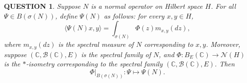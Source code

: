 \documentclass[12pt]{article}
\renewcommand{\b}{\mathscr{B}}
\renewcommand{\(}{\left(}%
\renewcommand{\)}{\right)}%
\renewcommand{\[}{\left[}%
\renewcommand{\]}{\right]}%
\renewcommand{\c}{\mathbb{C}}
\newtheorem{question}{QUESTION}[section]}
\begin{document}
  \begin{question}
   Suppose $N$ is a normal operator on Hilbert space $H$. For all $\Psi\in B(\sigma(N) )$, define $\Psi(N)$ as follows: for every $x,y\in H$,
   \begin{equation*}
    \langle \Psi(N)x,y\rangle=\int_{\sigma(N)}\Phi(z)m_{x,y}(dz),
   \end{equation*}
   where $m_{x,y}(dz)$ is the spectral measure of $N$ corresponding to $x,y$. Moreover, suppose $(\c,\b(\c),E)$ is the spectral family of $N$, and $\Phi:B_E(\c)\to \mathscr{N}(H)$ is the $*$-isometry corresponding to the spectral family $(\c,\b(\c),E)$. Then
   \begin{equation*}
    \Phi|_{B(\sigma(N) )}:\Psi\mapsto \Psi(N).
   \end{equation*}
  \end{question}
\end{document}
